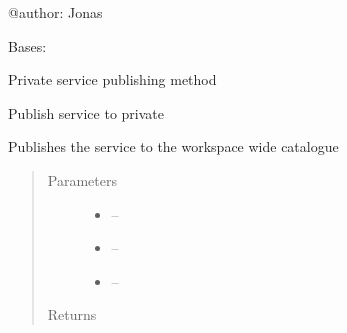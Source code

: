 \documentclass[letterpaper,10pt,english]{sphinxmanual}
\begin{document}
@author: Jonas

\begin{fulllineitems}
\label{_source/son_editor.apis:son_editor.apis.project_servicesapi.PrivateService}
Bases: 

Private service publishing method

\begin{fulllineitems}
\label{_source/son_editor.apis:son_editor.apis.project_servicesapi.PrivateService.get}
Publish service to private

Publishes the service to the workspace wide catalogue
\begin{quote}\begin{description}
\item[{Parameters}] \leavevmode\begin{itemize}
\item {} 
 -- 

\item {} 
 -- 

\item {} 
 -- 

\end{itemize}

\item[{Returns}] \leavevmode


\end{description}\end{quote}

\end{fulllineitems}


\begin{fulllineitems}
\label{_source/son_editor.apis:son_editor.apis.project_servicesapi.PrivateService.methods}
\end{fulllineitems}


\end{fulllineitems}
\end{document}
